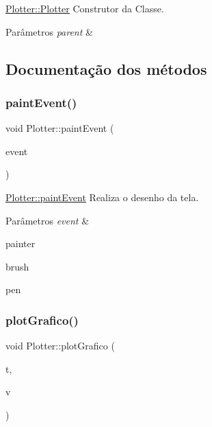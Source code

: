 \hyperlink{class_plotter_a9d8f6981cf177bc3e843465d2b3425e9}{Plotter\+::\+Plotter} Construtor da Classe. 


\begin{DoxyParams}{Parâmetros}
{\em parent} & \\
\hline
\end{DoxyParams}


\subsection{Documentação dos métodos}
\mbox{\label{class_plotter_a06477bf987646f000a8982db1352a11d}} 
\subsubsection{\texorpdfstring{paint\+Event()}{paintEvent()}}
{\footnotesize\ttfamily void Plotter\+::paint\+Event (\begin{DoxyParamCaption}\item[{Q\+Paint\+Event $\ast$}]{event }\end{DoxyParamCaption})}



\hyperlink{class_plotter_a06477bf987646f000a8982db1352a11d}{Plotter\+::paint\+Event} Realiza o desenho da tela. 


\begin{DoxyParams}{Parâmetros}
{\em event} & \\
\hline
\end{DoxyParams}
painter

brush

pen\mbox{\label{class_plotter_a29034483f5519c5bf9dac3ac849e0466}} 
\subsubsection{\texorpdfstring{plot\+Grafico()}{plotGrafico()}}
{\footnotesize\ttfamily void Plotter\+::plot\+Grafico (\begin{DoxyParamCaption}\item[{vector$<$ qint64 $>$ \&}]{t,  }\item[{vector$<$ int $>$ \&}]{v }\end{DoxyParamCaption})}




